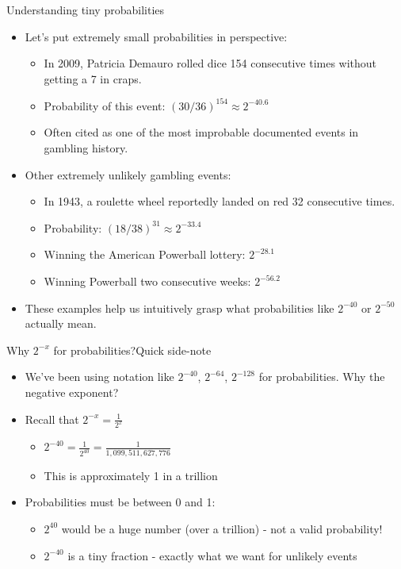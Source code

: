 \documentclass[aspectratio=169, lualatex, handout]{beamer}
\begin{document}
\begin{frame}{Understanding tiny probabilities}
	\begin{itemize}
		\item Let's put extremely small probabilities in perspective:
		      \begin{itemize}
			      \item In 2009, Patricia Demauro rolled dice 154 consecutive times without getting a 7 in craps.
			      \item Probability of this event: $(30/36)^{154} \approx 2^{-40.6}$
			      \item Often cited as one of the most improbable documented events in gambling history.
		      \end{itemize}
		\item Other extremely unlikely gambling events:
		      \begin{itemize}
			      \item In 1943, a roulette wheel reportedly landed on red 32 consecutive times.
			      \item Probability: $(18/38)^{31} \approx 2^{-33.4}$
			      \item Winning the American Powerball lottery: $2^{-28.1}$
			      \item Winning Powerball two consecutive weeks: $2^{-56.2}$
		      \end{itemize}
		\item These examples help us intuitively grasp what probabilities like $2^{-40}$ or $2^{-50}$ actually mean.
	\end{itemize}
\end{frame}

\begin{frame}{Why $2^{-x}$ for probabilities?}{Quick side-note}
	\begin{itemize}
		\item We've been using notation like $2^{-40}$, $2^{-64}$, $2^{-128}$ for probabilities. Why the negative exponent?
		\item Recall that $2^{-x} = \frac{1}{2^x}$
		      \begin{itemize}
			      \item $2^{-40} = \frac{1}{2^{40}} = \frac{1}{1,099,511,627,776}$
			      \item This is approximately 1 in a trillion
		      \end{itemize}
		\item Probabilities must be between 0 and 1:
		      \begin{itemize}
			      \item $2^{40}$ would be a huge number (over a trillion) - not a valid probability!
			      \item $2^{-40}$ is a tiny fraction - exactly what we want for unlikely events
		      \end{itemize}
	\end{itemize}
\end{frame}
\end{document}
